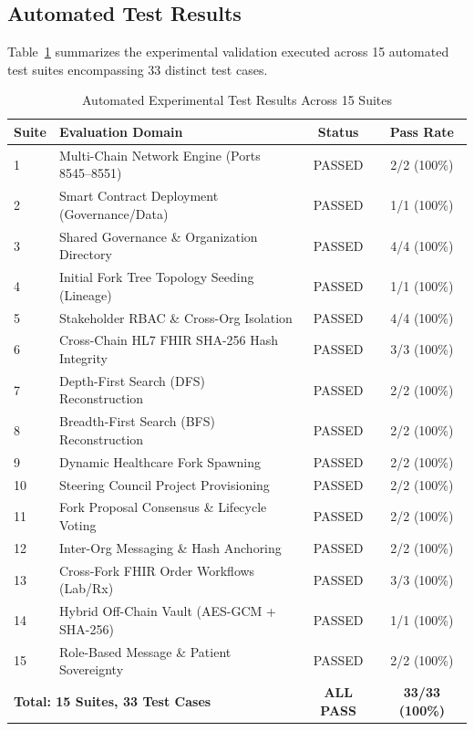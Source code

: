 \documentclass[conference]{IEEEtran}
\theoremstyle{definition}
\begin{document}
\subsection{Automated Test Results}
Table~\ref{tab:eval} summarizes the experimental validation executed across 15 automated test suites encompassing 33 distinct test cases.

\begin{table}[htbp]
\centering
\caption{Automated Experimental Test Results Across 15 Suites}
\label{tab:eval}
\begin{tabular}{llcc}
\toprule
\textbf{Suite} & \textbf{Evaluation Domain} & \textbf{Status} & \textbf{Pass Rate} \\
\midrule
1  & Multi-Chain Network Engine (Ports 8545--8551) & PASSED & 2/2 (100\%) \\
2  & Smart Contract Deployment (Governance/Data)   & PASSED & 1/1 (100\%) \\
3  & Shared Governance \& Organization Directory   & PASSED & 4/4 (100\%) \\
4  & Initial Fork Tree Topology Seeding (Lineage)  & PASSED & 1/1 (100\%) \\
5  & Stakeholder RBAC \& Cross-Org Isolation       & PASSED & 4/4 (100\%) \\
6  & Cross-Chain HL7 FHIR SHA-256 Hash Integrity   & PASSED & 3/3 (100\%) \\
7  & Depth-First Search (DFS) Reconstruction       & PASSED & 2/2 (100\%) \\
8  & Breadth-First Search (BFS) Reconstruction     & PASSED & 2/2 (100\%) \\
9  & Dynamic Healthcare Fork Spawning              & PASSED & 2/2 (100\%) \\
10 & Steering Council Project Provisioning          & PASSED & 2/2 (100\%) \\
11 & Fork Proposal Consensus \& Lifecycle Voting   & PASSED & 2/2 (100\%) \\
12 & Inter-Org Messaging \& Hash Anchoring         & PASSED & 2/2 (100\%) \\
13 & Cross-Fork FHIR Order Workflows (Lab/Rx)      & PASSED & 3/3 (100\%) \\
14 & Hybrid Off-Chain Vault (AES-GCM + SHA-256)    & PASSED & 1/1 (100\%) \\
15 & Role-Based Message \& Patient Sovereignty     & PASSED & 2/2 (100\%) \\
\midrule
\multicolumn{2}{l}{\textbf{Total: 15 Suites, 33 Test Cases}} & \textbf{ALL PASS} & \textbf{33/33 (100\%)} \\
\bottomrule
\end{tabular}
\end{table}
\end{document}
